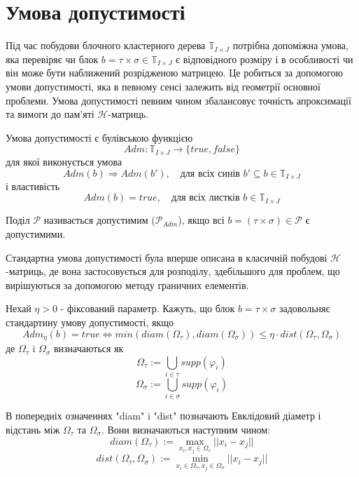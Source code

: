 \documentclass[12pt]{report}
\begin{document}
	\section{Умова допустимості}
	\hspace{0.8cm} Під час побудови блочного кластерного дерева $\mathbb{T}_{I\times J}$ потрібна допоміжна умова, яка перевіряє чи блок $b=\tau\times\sigma\in \mathbb{T}_{I\times J}$ є відповідного розміру і в особливості чи він може бути наближений розрідженою матрицею. Це робиться за допомогою умови допустимості, яка в певному сенсі залежить від геометрії основної проблеми. Умова допустимості певним чином збалансовує точність апроксимації та вимоги до пам'яті $\mathcal{H}$-матриць.
	\begin{Def}
	Умова допустимості є булівською функцією 
	$$Adm:\mathbb{T}_{I\times J}\rightarrow\{true,false\}$$
	для якої виконується умова
	$$Adm(b)\Rightarrow Adm(b'),\quad\text{для всіх синів } b'\subseteq b\in \mathbb{T}_{I\times J} $$
	і властивість\newline 
	\hspace{2cm}$$Adm(b)=true, \quad\text{для всіх листків } b\in \mathbb{T}_{I\times J}$$
	\end{Def}
	\begin{Def}
		Поділ $\mathcal{P}$ називається допустимим ($\mathcal{P}_{Adm}$), якщо всі $b=(\tau\times\sigma)\in \mathcal{P}$ є допустимими.
	\end{Def}
	\hspace{0.8cm} Стандартна умова допустимості була вперше описана в класичній побудові $\mathcal{H}$-матриць, де вона застосовується для розподілу, здебільшого для проблем, що вирішуються за допомогою методу граничних елементів.
	\begin{Def}
	Нехай $\eta>0$ - фіксований параметр. Кажуть, що блок $b=\tau\times\sigma$ задовольняє стандартину умову допустимості, якщо 
	$$Adm_\eta(b)=true\Leftrightarrow min(diam(\Omega_{\tau}),diam(\Omega_{\sigma}))\le \eta\cdot dist(\Omega_{\tau},\Omega_{\sigma})$$
	де $\Omega_{\tau}$ i $\Omega_{\sigma}$ визначаються як
	$$\Omega_{\tau}:=\bigcup_{i\in \tau}supp(\varphi_i)$$
	$$\Omega_{\sigma}:=\bigcup_{i\in \sigma}supp(\varphi_i)$$
	\end{Def}
	\par В попередніх означеннях "diam" i "dist" позначають Евклідовий діаметр і відстань між $\Omega_{\tau}$ та $\Omega_{\sigma}$. Вони визначаються наступним чином:
	$$diam(\Omega_{\tau}):=\max_{x_i,x_j\in\Omega_{\tau}}||x_i-x_j||$$
	$$dist(\Omega_{\tau},\Omega_{\sigma}):=\min_{x_i\in\Omega_{\tau},x_j\in\Omega_{\sigma}}||x_i-x_j||$$
\end{document}
